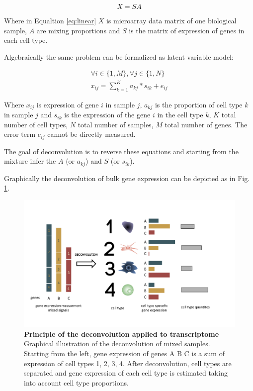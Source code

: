 \documentclass[12pt,]{book}
\theoremstyle{definition}
\theoremstyle{definition}
\theoremstyle{definition}
\theoremstyle{remark}
\begin{document}
\begin{equation} 
X = SA  \label{eq:linear}
\end{equation}

Where in Equaltion \eqref{eq:linear} \(X\) is microarray data matrix of
one biological sample, \(A\) are mixing proportions and \(S\) is the
matrix of expression of genes in each cell type.

Algebraically the same problem can be formalized as latent variable
model:

\begin{equation} 
\begin{aligned}
\forall i \in \{1,M\},  \forall  j \in \{1,N\} \\
x_{ij}= \sum_{k=1}^K a_{kj} *s_{ik}+ e_{ij} \label{eq:algebraic}
\end{aligned}
\end{equation}

Where \(x_{ij}\) is expression of gene \(i\) in sample \(j\), \(a_{kj}\)
is the proportion of cell type \(k\) in sample \(j\) and \(s_{ik}\) is
the expression of the gene \(i\) in the cell type \(k\), \(K\) total
number of cell types, \(N\) total number of samples, \(M\) total number
of genes. The error term \(e_{ij}\) cannot be directly measured.

The goal of deconvolution is to reverse these equations and starting
from the mixture infer the \(A\) (or \(a_{kj}\)) and \(S\) (or
\(s_{ik}\)).

Graphically the deconvolution of bulk gene expression can be depicted as
in Fig. \ref{fig:deconvolution-cartoon}.

\begin{figure}

{\centering \includegraphics[width=1\linewidth]{figures-ext/deconv} 

}

\caption[Principle of the deconvolution applied to transcriptome]{\textbf{Principle of the
deconvolution applied to transcriptome} Graphical illustration of the
deconvolution of mixed samples. Starting from the left, gene expression
of genes A B C is a sum of expression of cell types 1, 2, 3, 4. After
deconvolution, cell types are separated and gene expression of each cell
type is estimated taking into account cell type proportions.}\label{fig:deconvolution-cartoon}
\end{figure}
\end{document}
